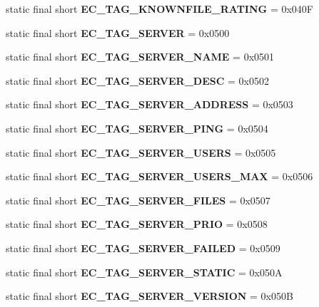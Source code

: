 \begin{DoxyCompactItemize}
\item 
static final short {\bfseries EC\_\-TAG\_\-KNOWNFILE\_\-RATING} = 0x040F\label{interfaceECCodes_a91e43b6b2ab2f66003ea727194f39dc7}

\item 
static final short {\bfseries EC\_\-TAG\_\-SERVER} = 0x0500\label{interfaceECCodes_aac7a1cac8b23dd295f394883d1e42c47}

\item 
static final short {\bfseries EC\_\-TAG\_\-SERVER\_\-NAME} = 0x0501\label{interfaceECCodes_ae9c4728f121e34caee5d11c0121dba31}

\item 
static final short {\bfseries EC\_\-TAG\_\-SERVER\_\-DESC} = 0x0502\label{interfaceECCodes_af1819b4bf3c1edc73d9e6c01fa9626fe}

\item 
static final short {\bfseries EC\_\-TAG\_\-SERVER\_\-ADDRESS} = 0x0503\label{interfaceECCodes_af930c011466368bfd6eaae59c502203b}

\item 
static final short {\bfseries EC\_\-TAG\_\-SERVER\_\-PING} = 0x0504\label{interfaceECCodes_a39ac33b5db298c45fc1ff3f55b742f41}

\item 
static final short {\bfseries EC\_\-TAG\_\-SERVER\_\-USERS} = 0x0505\label{interfaceECCodes_adb1c3a3ea002eec197494103b41c44dc}

\item 
static final short {\bfseries EC\_\-TAG\_\-SERVER\_\-USERS\_\-MAX} = 0x0506\label{interfaceECCodes_a86afd27cf628c698cdba36d8de347b7e}

\item 
static final short {\bfseries EC\_\-TAG\_\-SERVER\_\-FILES} = 0x0507\label{interfaceECCodes_a15fb1b93f9b007e5098ec9c9ffcf55e3}

\item 
static final short {\bfseries EC\_\-TAG\_\-SERVER\_\-PRIO} = 0x0508\label{interfaceECCodes_acc4f500379ecb6b1b950279458a18d7a}

\item 
static final short {\bfseries EC\_\-TAG\_\-SERVER\_\-FAILED} = 0x0509\label{interfaceECCodes_a57fef1abe6cef1568c419ea2ae143c63}

\item 
static final short {\bfseries EC\_\-TAG\_\-SERVER\_\-STATIC} = 0x050A\label{interfaceECCodes_af4cb040b61fc7ccd5de03b4b1d1ba744}

\item 
static final short {\bfseries EC\_\-TAG\_\-SERVER\_\-VERSION} = 0x050B\label{interfaceECCodes_a98aed2ad4d5f849147f9598c059ae613}


\end{DoxyCompactItemize}
